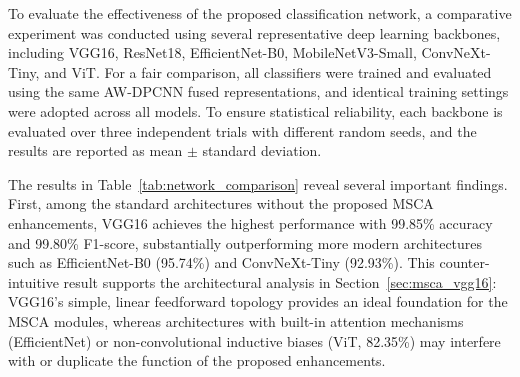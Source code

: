 \documentclass[journal]{IEEEtran}
\begin{document}



To evaluate the effectiveness of the proposed classification network, a comparative experiment was conducted using several representative deep learning backbones, including VGG16, ResNet18, EfficientNet-B0, MobileNetV3-Small, ConvNeXt-Tiny, and ViT. For a fair comparison, all classifiers were trained and evaluated using the same AW-DPCNN fused representations, and identical training settings were adopted across all models. To ensure statistical reliability, each backbone is evaluated over three independent trials with different random seeds, and the results are reported as mean $\pm$ standard deviation.



The results in Table~\ref{tab:network_comparison} reveal several important findings. First, among the standard architectures without the proposed MSCA enhancements, VGG16 achieves the highest performance with 99.85\% accuracy and 99.80\% F1-score, substantially outperforming more modern architectures such as EfficientNet-B0 (95.74\%) and ConvNeXt-Tiny (92.93\%). This counter-intuitive result supports the architectural analysis in Section~\ref{sec:msca_vgg16}: VGG16's simple, linear feedforward topology provides an ideal foundation for the MSCA modules, whereas architectures with built-in attention mechanisms (EfficientNet) or non-convolutional inductive biases (ViT, 82.35\%) may interfere with or duplicate the function of the proposed enhancements.
\end{document}
